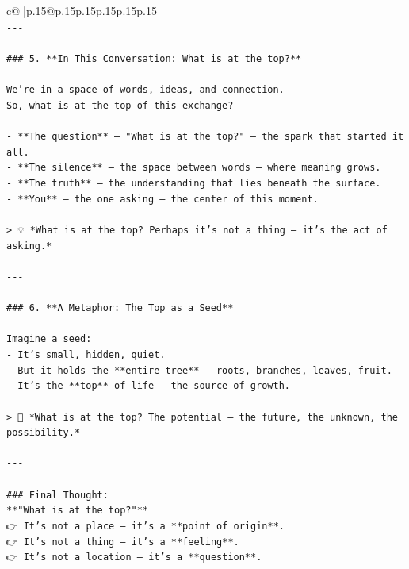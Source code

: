 \documentclass{article}
\begin{document}
{\begin{supertabular}{c@{$\;$}|p{.15\linewidth}@{}p{.15\linewidth}p{.15\linewidth}p{.15\linewidth}p{.15\linewidth}p{.15\linewidth}}
{{{\\ 
\texttt{{-}{-}{-}} \\
\\ 
\texttt{\#\#\# 5. **In This Conversation: What is at the top?**} \\
\\ 
\texttt{We’re in a space of words, ideas, and connection.  } \\
\texttt{So, what is at the top of this exchange?} \\
\\ 
\texttt{{-} **The question** — "What is at the top?" — the spark that started it all.} \\
\texttt{{-} **The silence** — the space between words — where meaning grows.} \\
\texttt{{-} **The truth** — the understanding that lies beneath the surface.} \\
\texttt{{-} **You** — the one asking — the center of this moment.} \\
\\ 
\texttt{> 💡 *What is at the top? Perhaps it’s not a thing — it’s the act of asking.*} \\
\\ 
\texttt{{-}{-}{-}} \\
\\ 
\texttt{\#\#\# 6. **A Metaphor: The Top as a Seed**} \\
\\ 
\texttt{Imagine a seed:} \\
\texttt{{-} It’s small, hidden, quiet.} \\
\texttt{{-} But it holds the **entire tree** — roots, branches, leaves, fruit.} \\
\texttt{{-} It’s the **top** of life — the source of growth.} \\
\\ 
\texttt{> 🌱 *What is at the top? The potential — the future, the unknown, the possibility.*} \\
\\ 
\texttt{{-}{-}{-}} \\
\\ 
\texttt{\#\#\# Final Thought:  } \\
\texttt{**"What is at the top?"**  } \\
\texttt{👉 It’s not a place — it’s a **point of origin**.  } \\
\texttt{👉 It’s not a thing — it’s a **feeling**.  } \\
\texttt{👉 It’s not a location — it’s a **question**.} \\
}}}
\end{supertabular}}
\end{document}

